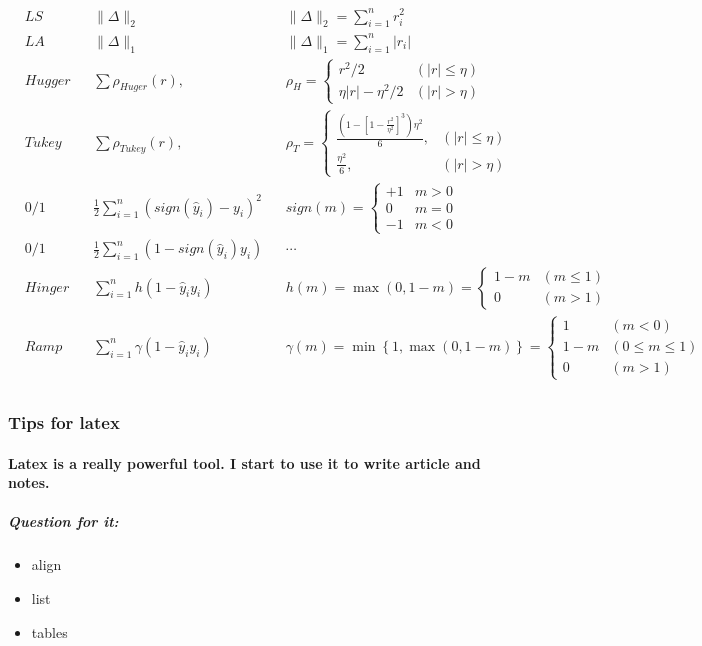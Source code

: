 \documentclass[10pt,a4paper]{article}
\begin{document}
\begin{align*}
&LS  	
&&\|\Delta\|_2
&& \|\Delta\|_2 = \sum_{i=1}^n r_i^2    
\\
&LA 	
&& \|\Delta\|_1
&& \|\Delta\|_1 = \sum_{i=1}^n |r_i|
\\
&Hugger 
&& \sum\rho_{Huger}(r),   
&&\rho_H = \begin{cases}
    r^2/2 &(|r| \le \eta)\\
    \eta|r|-\eta^2/2  &(|r| > \eta)
    \end{cases}
\\
&Tukey  
&& \sum\rho_{Tukey}(r),
&&\rho_T =  \begin{cases}
        \frac{\left(1- [1-\frac{r^2}{\eta^2}]^3 \right)\eta^2}{6},
        &(|r|\le\eta)
        \\        
        \frac{\eta^2}{6}, &(|r| > \eta)
    \end{cases}
\\
&0/1 
&& \frac{1}{2}\sum_{i=1}^n \left(sign(\hat{y}_i)-y_i\right)^2
&&sign(m) = \begin{cases}
		 +1 & m > 0 \\
		 0  & m = 0  \\
		 -1 & m < 0
	\end{cases}	
\\
&0/1 
&&\frac{1}{2}\sum_{i=1}^n\left( 1 - sign(\hat{y}_i)y_i \right)
&&\cdots
\\
&Hinger
&& \sum_{i=1}^n h(1-\hat{y}_iy_i)
&&h(m)=\max(0,1-m) = 	           
    \begin{cases}
        1-m       &( m \le 1) \\
        0          &(m > 1)
    \end{cases}
\\
&Ramp
&& \sum_{i=1}^n \gamma(1-\hat{y}_iy_i)
&&\gamma(m)=\min \left\{ 1, \max(0,1-m) \right\}= 	           
    \begin{cases}
        1          &(m < 0) \\
        1-m       &(0\le m \le 1) \\
        0          &(m > 1)
    \end{cases}
\\
\end{align*}



\subsubsection{Tips for latex}
\paragraph{
Latex is a really powerful tool. I start to use it to write article and notes. 
} 
\subparagraph{Question for it:}
\begin{itemize} %
 \item align
 \item list
 \item tables
\end{itemize}
%
%
\pgfplotsset{width=6cm,compat=1.9}
\end{document}
